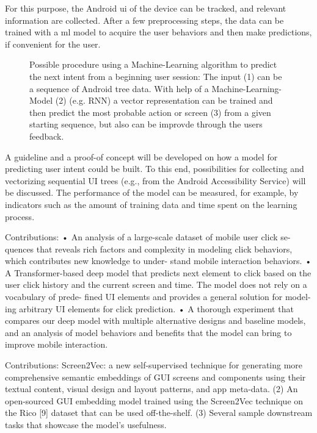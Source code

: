 For this purpose, the Android \gls{ui} of the device can be tracked, and relevant information are collected.
After a few preprocessing steps, the data can be trained with a \gls{ml} model to acquire the user behaviors and then make predictions, if convenient for the user.

\begin{figure}[htbp!]
    \centering
    
    \caption[Schema of ML-algorithm predicting user intent]{
        Possible procedure using a Machine-Learning algorithm to predict the next intent from a beginning user session:
        The input (1) can be a sequence of Android tree data.
        With help of a Machine-Learning-Model (2) (e.g. RNN) a vector representation can be trained and then predict the most probable action or screen (3) from a given starting sequence, but also can be improvde through the users feedback.
    }
    \label{fig:encode-decode}
\end{figure}

A guideline and a proof-of concept will be developed on how a model for predicting user intent could be built.
To this end, possibilities for collecting and vectorizing sequential UI trees (e.g., from the Android Accessibility Service) will be discussed.
The performance of the model can be measured, for example, by indicators such as the amount of training data and time spent on the learning process.


Contributions: \cite{zhou2021large}
• An analysis of a large-scale dataset of mobile user click se-
quences that reveals rich factors and complexity in modeling
click behaviors, which contributes new knowledge to under-
stand mobile interaction behaviors.
• A Transformer-based deep model that predicts next element
to click based on the user click history and the current screen
and time. The model does not rely on a vocabulary of prede-
fined UI elements and provides a general solution for model-
ing arbitrary UI elements for click prediction.
• A thorough experiment that compares our deep model with
multiple alternative designs and baseline models, and an
analysis of model behaviors and benefits that the model can
bring to improve mobile interaction.

Contributions: \cite{li2021screen2vec}
Screen2Vec: a new self-supervised technique for generating
more comprehensive semantic embeddings of GUI screens
and components using their textual content, visual design
and layout patterns, and app meta-data.
(2) An open-sourced GUI embedding model trained using the
Screen2Vec technique on the Rico [9] dataset that can be
used off-the-shelf.
(3) Several sample downstream tasks that showcase the model’s
usefulness.

